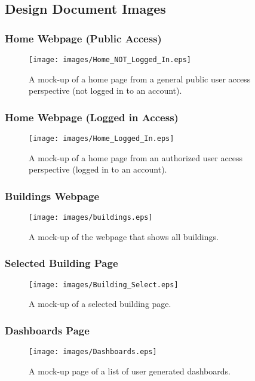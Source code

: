 \subsection{Design Document Images}
\subsubsection{Home Webpage (Public Access)}
\label{sec:home_public}
\begin{figure}[H]
    \centering
    \texttt{[image: images/Home\_NOT\_Logged\_In.eps]}
    \caption{A mock-up of a home page from a general public user access perspective (not logged in to an account).}
\end{figure}

\subsubsection{Home Webpage (Logged in Access)}
\label{sec:home_logged}
\begin{figure}[H]
    \centering
    \texttt{[image: images/Home\_Logged\_In.eps]}
    \caption{A mock-up of a home page from an authorized user access perspective (logged in to an account).}
\end{figure}

\subsubsection{Buildings Webpage}
\label{sec:buildings}
\begin{figure}[H]
    \centering
    \texttt{[image: images/buildings.eps]}
    \caption{A mock-up of the webpage that shows all buildings.}
\end{figure}

\subsubsection{Selected Building Page}
\label{sec:selected_buildings}
\begin{figure}[H]
    \centering
    \texttt{[image: images/Building\_Select.eps]}
    \caption{A mock-up of a selected building page.}
\end{figure}


\subsubsection{Dashboards Page}
\label{sec:dashboards}
\begin{figure}[H]
    \centering
    \texttt{[image: images/Dashboards.eps]}
    \caption{A mock-up page of a list of user generated dashboards.}
\end{figure}

